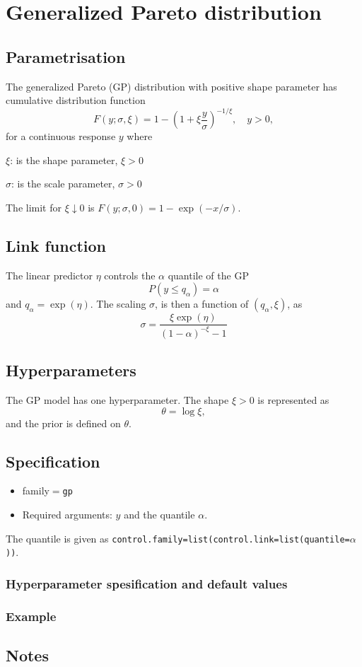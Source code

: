 \documentclass[12pt]{article}
\begin{document}
\section*{Generalized Pareto distribution}
\subsection*{Parametrisation}
The generalized Pareto (GP) distribution with positive shape parameter
has cumulative distribution function
$$
F(y;\sigma,\xi)=1-\left(1+\xi\frac{y}{\sigma}\right)^{-1/\xi},
\quad y>0,
$$
for a continuous response $y$ where
\begin{description}
\item $\xi$: is the shape parameter, $\xi>0$
\item $\sigma$: is the scale parameter, $\sigma>0$
\end{description}
The limit for $\xi\downarrow 0$ is
$F(y;\sigma,0)=1-\exp(-x/\sigma)$.

\subsection*{Link function}

The linear predictor $\eta$ controls the $\alpha$ quantile of
the GP
\begin{displaymath}
    P(y \le q_{\alpha}) = \alpha
\end{displaymath}
and $q_{\alpha} = \exp(\eta)$. The scaling $\sigma$, is then a
function of $(q_{\alpha}, \xi)$, as
\begin{displaymath}
    \sigma = \frac{\xi\exp(\eta)}{(1-\alpha)^{-\xi}-1}
\end{displaymath}

\subsection*{Hyperparameters}
The $\mathrm{GP}$ model has one hyperparameter. The shape $\xi>0$ is
represented as
$$
\theta=\log \xi,
$$
and the prior is defined on $\theta$.

\subsection*{Specification}
\begin{itemize}
\item family$=$\texttt{gp}
\item Required arguments: $y$ and the quantile $\alpha$. 
\end{itemize}
The quantile is given as \texttt{control.family=list(control.link=list(quantile=$\alpha$))}.

\subsubsection*{Hyperparameter spesification and default values}


\subsubsection*{Example}


\subsection*{Notes}
        
\end{document}
